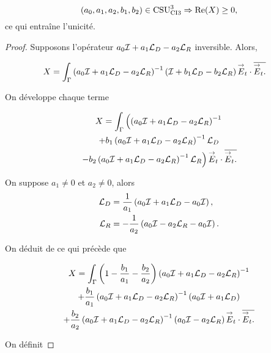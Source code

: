   
  \begin{prop}
    \label{prop:csu:ci3-3}
    \begin{equation*}
      (a_0,a_1,a_2,b_1,b_2) \in \CSU[3]{CI3} \Rightarrow \Re(X) \ge 0,
    \end{equation*}
    ce qui entraîne l'unicité.
  \end{prop}

  \begin{proof}
    Supposons l'opérateur \(a_0\oI + a_1 \LD - a_2 \LR\) inversible. Alors,

    \begin{align*}
      X &= \int_\Gamma \left(a_0\oI + a_1 \LD - a_2 \LR \right)^{-1}\left( \oI + b_1 \LD - b_2 \LR \right) \vE_t\cdot \conj{\vE_t.}
    \end{align*}

    On développe chaque terme

    \begin{multline*}
      X = \int_\Gamma \left(\left(a_0\oI + a_1 \LD - a_2 \LR \right)^{-1}
      \right.
      \\
      + b_1 \left(a_0\oI + a_1 \LD - a_2 \LR \right)^{-1}\LD
      \\
      \left.
      - b_2 \left(a_0\oI + a_1 \LD - a_2 \LR \right)^{-1}\LR \right) \vE_t\cdot \conj{\vE_t.}
    \end{multline*}

    On suppose \(a_1\not=0\) et \(a_2\not=0\), alors
    \begin{align*}
      \LD & = \frac{1}{a_1}\left(a_0\oI + a_1 \LD - a_0\oI\right),
      \\
      \LR & = -\frac{1}{a_2}\left(a_0\oI - a_2 \LR - a_0\oI\right).
    \end{align*}


    On déduit de ce qui précède que

    \begin{multline*}
      X = \int_\Gamma \left(1-\frac{b_1}{a_1} -\frac{b_2}{a_2}\right)\left(a_0\oI + a_1 \LD - a_2 \LR \right)^{-1}
      \\
      + \frac{b_1}{a_1} \left(a_0\oI + a_1 \LD - a_2 \LR \right)^{-1}\left(a_0\oI + a_1\LD\right)
      \\
      + \frac{b_2}{a_2} \left(a_0\oI + a_1 \LD - a_2 \LR \right)^{-1}\left(a_0\oI - a_2\LR\right) \vE_t\cdot \conj{\vE_t.}
    \end{multline*}

    On définit


\end{proof}
